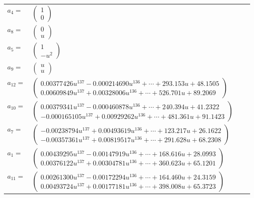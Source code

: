 \documentclass[1p]{elsarticle_modified}
\theoremstyle{definition}
\begin{document}
\begin{tabular}{m{7pt} m{180pt} m{7pt} m{180pt} }
\flushright $a_{4}=$&$\begin{pmatrix}1\\0\end{pmatrix}$ \\
\flushright $a_{8}=$&$\begin{pmatrix}0\\u\end{pmatrix}$ \\
\flushright $a_{5}=$&$\begin{pmatrix}1\\- u^2\end{pmatrix}$ \\
\flushright $a_{9}=$&$\begin{pmatrix}u\\u\end{pmatrix}$ \\
\flushright $a_{12}=$&$\begin{pmatrix}0.00377426 u^{137}-0.000214690 u^{136}+\cdots+293.153 u+48.1505\\0.00609849 u^{137}+0.00328006 u^{136}+\cdots+526.701 u+89.2069\end{pmatrix}$ \\
\flushright $a_{10}=$&$\begin{pmatrix}0.00379341 u^{137}-0.000460878 u^{136}+\cdots+240.394 u+41.2322\\-0.000165105 u^{137}+0.00929262 u^{136}+\cdots+481.361 u+91.1423\end{pmatrix}$ \\
\flushright $a_{7}=$&$\begin{pmatrix}-0.00238794 u^{137}+0.00493619 u^{136}+\cdots+123.217 u+26.1622\\-0.00357361 u^{137}+0.00819517 u^{136}+\cdots+291.628 u+68.2308\end{pmatrix}$ \\
\flushright $a_{1}=$&$\begin{pmatrix}0.00439295 u^{137}-0.00147919 u^{136}+\cdots+168.616 u+28.0993\\0.00376122 u^{137}+0.00304781 u^{136}+\cdots+360.623 u+65.1201\end{pmatrix}$ \\
\flushright $a_{11}=$&$\begin{pmatrix}0.00261300 u^{137}-0.00172294 u^{136}+\cdots+164.460 u+24.3159\\0.00493724 u^{137}+0.00177181 u^{136}+\cdots+398.008 u+65.3723\end{pmatrix}$ \\

\end{tabular}
\end{document}
